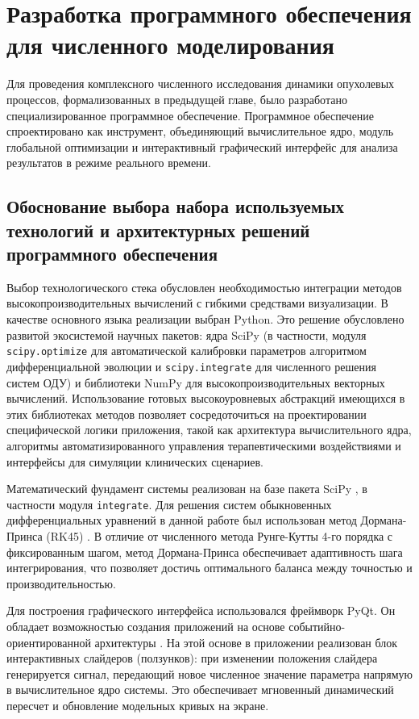 \chapter{Разработка программного обеспечения для численного моделирования}

Для проведения комплексного численного исследования динамики опухолевых
процессов, формализованных в предыдущей главе, было разработано
специализированное программное обеспечение. Программное обеспечение спроектировано
как инструмент, объединяющий вычислительное ядро, модуль глобальной оптимизации
и интерактивный графический интерфейс для анализа результатов в режиме реального времени.

\section{Обоснование выбора набора используемых технологий и архитектурных решений
программного обеспечения}

Выбор технологического стека обусловлен необходимостью интеграции методов
высокопроизводительных вычислений с гибкими средствами визуализации. В качестве
основного языка реализации выбран Python. Это решение обусловлено развитой
экосистемой научных пакетов:  ядра SciPy (в частности, модуля
  \texttt{scipy.optimize} для автоматической калибровки параметров алгоритмом
  дифференциальной эволюции и \texttt{scipy.integrate} для численного решения
систем ОДУ) и библиотеки NumPy \cite{numpy} для высокопроизводительных
векторных вычислений.
Использование готовых высокоуровневых абстракций имеющихся в этих библиотеках методов
позволяет сосредоточиться на проектировании специфической логики приложения,
такой как архитектура вычислительного ядра, алгоритмы автоматизированного
управления терапевтическими воздействиями и интерфейсы для симуляции
клинических сценариев.

Математический фундамент системы реализован на базе пакета SciPy \cite{scipy}, в частности
модуля \texttt{integrate}. Для решения систем обыкновенных дифференциальных
уравнений в данной работе был использован метод Дормана-Принса (RK45)
\cite{dormand_prince}. В отличие от численного метода Рунге-Кутты 4-го порядка
с фиксированным шагом, метод Дормана-Принса обеспечивает адаптивность шага
интегрирования, что позволяет достичь оптимального баланса между точностью и
производительностью.

Для построения графического интерфейса использовался фреймворк PyQt.
Он обладает возможностью создания приложений на основе
событийно-ориентированной архитектуры \cite{oop}. На этой основе в приложении
реализован блок интерактивных слайдеров (ползунков): при изменении положения
слайдера генерируется сигнал, передающий новое численное значение параметра
напрямую в вычислительное ядро системы. Это обеспечивает мгновенный
динамический пересчет и обновление модельных кривых на экране.

